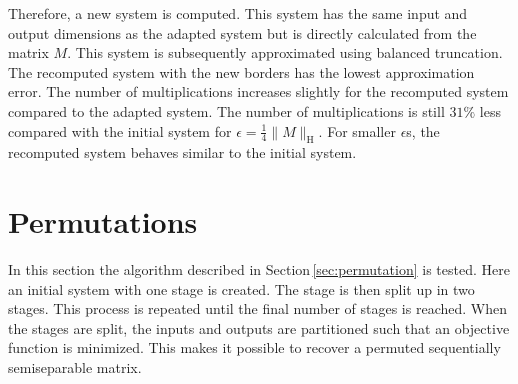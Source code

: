 \documentclass[numbers=noenddot,doctype=mastersthesis,BCOR=15mm,biblatex]{ldvbook}%
\begin{document}
Therefore, a new system is computed. 
This system has the same input and output dimensions as the adapted system but is directly calculated from the matrix $M$.
This system is subsequently approximated using balanced truncation.
The recomputed system with the new borders has the lowest approximation error.
The number of multiplications increases slightly for the recomputed system compared to the adapted system.
The number of multiplications is still $31\%$ less compared with the initial system for $\epsilon = \frac{1}{4}\|M\|_\text{H}$.
For smaller $\epsilon$s,  the recomputed system behaves similar to the initial system.



\section{Permutations}\label{sec:test_perm}
In this section the algorithm described in Section\,\ref{sec:permutation} is tested.
Here an initial system with one stage is created.
The stage is then split up in two stages.
This process is repeated until the final number of stages is reached.
When the stages are split, the inputs and outputs are partitioned such that an objective function is minimized.
This makes it possible to recover a permuted sequentially semiseparable matrix.
\end{document}
